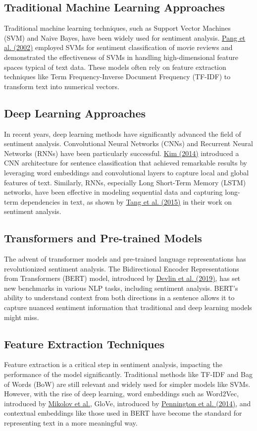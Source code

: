 \documentclass[12pt]{article}
\begin{document}
\subsection{Traditional Machine Learning Approaches}
Traditional machine learning techniques, such as Support Vector Machines (SVM) and Naive Bayes, have been widely used for sentiment analysis. \href{https://www.cs.cornell.edu/home/llee/papers/sentiment.pdf}{Pang et al. (2002)} employed SVMs for sentiment classification of movie reviews and demonstrated the effectiveness of SVMs in handling high-dimensional feature spaces typical of text data. These models often rely on feature extraction techniques like Term Frequency-Inverse Document Frequency (TF-IDF) to transform text into numerical vectors.

\subsection{Deep Learning Approaches}
In recent years, deep learning methods have significantly advanced the field of sentiment analysis. Convolutional Neural Networks (CNNs) and Recurrent Neural Networks (RNNs) have been particularly successful. \href{https://arxiv.org/abs/1408.5882}{Kim (2014)} introduced a CNN architecture for sentence classification that achieved remarkable results by leveraging word embeddings and convolutional layers to capture local and global features of text. Similarly, RNNs, especially Long Short-Term Memory (LSTM) networks, have been effective in modeling sequential data and capturing long-term dependencies in text, as shown by \href{https://www.aclweb.org/anthology/P15-1067/}{Tang et al. (2015)} in their work on sentiment analysis.

\subsection{Transformers and Pre-trained Models}
The advent of transformer models and pre-trained language representations has revolutionized sentiment analysis. The Bidirectional Encoder Representations from Transformers (BERT) model, introduced by \href{https://arxiv.org/abs/1810.04805}{Devlin et al. (2019)}, has set new benchmarks in various NLP tasks, including sentiment analysis. BERT's ability to understand context from both directions in a sentence allows it to capture nuanced sentiment information that traditional and deep learning models might miss.

\subsection{Feature Extraction Techniques}
Feature extraction is a critical step in sentiment analysis, impacting the performance of the model significantly. Traditional methods like TF-IDF and Bag of Words (BoW) are still relevant and widely used for simpler models like SVMs. However, with the rise of deep learning, word embeddings such as Word2Vec, introduced by \href{https://arxiv.org/abs/1301.3781}{Mikolov et al.}, GloVe, introduced by \href{https://nlp.stanford.edu/pubs/glove.pdf}{Pennington et al. (2014)}, and contextual embeddings like those used in BERT have become the standard for representing text in a more meaningful way.
\end{document}
